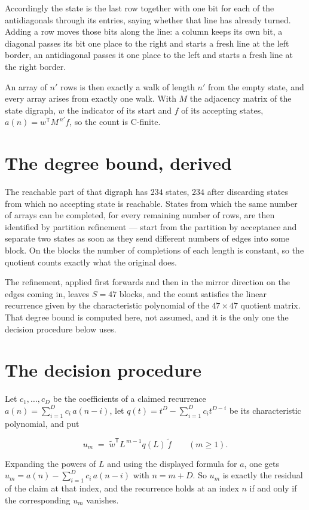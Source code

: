 \documentclass[11pt]{article}
\theoremstyle{definition}
\begin{document}
Accordingly the state is the last row together with one bit for each of the antidiagonals through its entries, saying whether that line has already turned. Adding a row moves those bits along the line: a column keeps its own bit, a diagonal passes its bit one place to the right and starts a fresh line at the left border, an antidiagonal passes it one place to the left and starts a fresh line at the right border.

An array of $n'$ rows is then exactly a walk of length $n'$ from the empty state, and every array arises from exactly one walk. With $M$ the adjacency matrix of the state digraph, $w$ the indicator of its start and $f$ of its accepting states, $a(n) = w^{\mathsf T}M^{\,n'}f$, so the count is C-finite.

\section{The degree bound, derived}

The reachable part of that digraph has $234$ states, $234$ after discarding states from which no accepting state is reachable. States from which the same number of arrays can be completed, for every remaining number of rows, are then identified by partition refinement --- start from the partition by acceptance and separate two states as soon as they send different numbers of edges into some block. On the blocks the number of completions of each length is constant, so the quotient counts exactly what the original does.

The refinement, applied first forwards and then in the mirror direction on the edges coming in, leaves $S = 47$ blocks, and the count satisfies the linear recurrence given by the characteristic polynomial of the $47 \times 47$ quotient matrix. That degree bound is computed here, not assumed, and it is the only one the decision procedure below uses.

\section{The decision procedure}

Let $c_1,\dots,c_D$ be the coefficients of a claimed recurrence $a(n) = \sum_{i=1}^{D} c_i\,a(n-i)$, let $q(t) = t^{D} - \sum_{i=1}^{D} c_i t^{D-i}$ be its characteristic polynomial, and put

\[u_m \;=\; \tilde w^{\mathsf T} L^{\,m-1} q(L)\,\tilde f \qquad (m \ge 1).\]

Expanding the powers of $L$ and using the displayed formula for $a$, one gets $u_m = a(n) - \sum_{i=1}^{D} c_i\,a(n-i)$ with $n = m + D$. So $u_m$ is exactly the residual of the claim at that index, and the recurrence holds at an index $n$ if and only if the corresponding $u_m$ vanishes.
\end{document}
